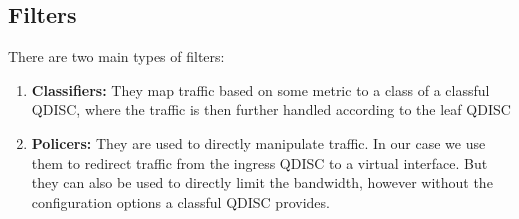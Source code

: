 \subsection{Filters}
There are two main types of filters:
\begin{enumerate}
\item \textbf{Classifiers:} They map traffic based on some metric to a class of a classful \acs{QDISC}, where the traffic is then further handled according to the leaf \acs{QDISC}
\item \textbf{Policers:} They are used to directly manipulate traffic. In our case we use them to redirect traffic from the ingress \acs{QDISC} to a virtual interface. But they can also be used to directly limit the bandwidth, however without the configuration options a classful \acs{QDISC} provides.
\end{enumerate}